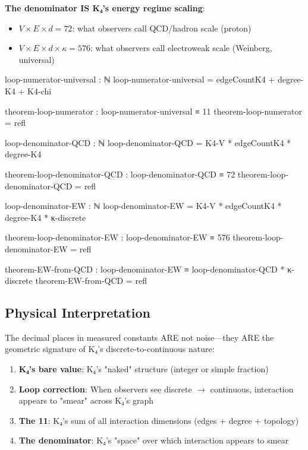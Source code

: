 \documentclass[11pt,a4paper]{book}
\begin{document}
\textbf{The denominator IS K₄'s energy regime scaling}:
\begin{itemize}
\item $V \times E \times d = 72$: what observers call QCD/hadron scale (proton)
\item $V \times E \times d \times \kappa = 576$: what observers call electroweak scale (Weinberg, universal)
\end{itemize}

\begin{code}
loop-numerator-universal : ℕ
loop-numerator-universal = edgeCountK4 + degree-K4 + K4-chi

theorem-loop-numerator : loop-numerator-universal ≡ 11
theorem-loop-numerator = refl

loop-denominator-QCD : ℕ
loop-denominator-QCD = K4-V * edgeCountK4 * degree-K4

theorem-loop-denominator-QCD : loop-denominator-QCD ≡ 72
theorem-loop-denominator-QCD = refl

loop-denominator-EW : ℕ
loop-denominator-EW = K4-V * edgeCountK4 * degree-K4 * κ-discrete

theorem-loop-denominator-EW : loop-denominator-EW ≡ 576
theorem-loop-denominator-EW = refl

theorem-EW-from-QCD : loop-denominator-EW ≡ loop-denominator-QCD * κ-discrete
theorem-EW-from-QCD = refl
\end{code}

\subsection{Physical Interpretation}

The decimal places in measured constants ARE not noise—they ARE the geometric signature of K₄'s discrete-to-continuous nature:

\begin{enumerate}
\item \textbf{K₄'s bare value}: K₄'s "naked" structure (integer or simple fraction)
\item \textbf{Loop correction}: When observers see discrete $\to$ continuous, interaction appears to "smear" across K₄'s graph
\item \textbf{The 11}: K₄'s sum of all interaction dimensions (edges + degree + topology)
\item \textbf{The denominator}: K₄'s "space" over which interaction appears to smear
\end{enumerate}
\end{document}
